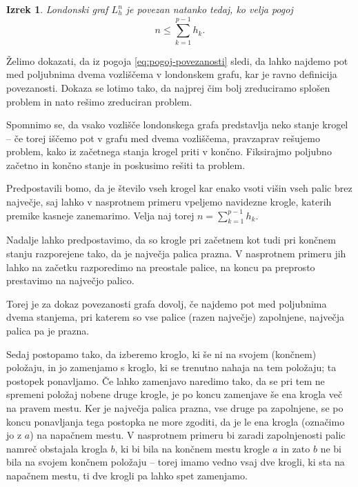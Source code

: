 \documentclass[12pt,a4paper]{amsart}
\theoremstyle{definition} %
\theoremstyle{plain} %
\newtheorem{izrek}[definicija]{Izrek}
\begin{document}
\begin{izrek}
    Londonski graf $L_h^n$ je povezan natanko tedaj, ko velja pogoj
    \begin{equation}
        n \leq \sum_{k=1}^{p-1} h_k.
        \label{eq:pogoj-povezanosti}
    \end{equation}
\end{izrek}

\proof
    Želimo dokazati, da iz pogoja \eqref{eq:pogoj-povezanosti} sledi, da lahko najdemo pot med poljubnima dvema vozliščema v londonskem grafu, kar je ravno definicija povezanosti. Dokaza se lotimo tako, da najprej čim bolj zreduciramo splošen problem in nato rešimo zreduciran problem.
    
    Spomnimo se, da vsako vozlišče londonskega grafa predstavlja neko stanje krogel -- če torej iščemo pot v grafu med dvema vozliščema, pravzaprav rešujemo problem, kako iz začetnega stanja krogel priti v končno. Fiksirajmo poljubno začetno in končno stanje in poskusimo rešiti ta problem.
    
    Predpostavili bomo, da je število vseh krogel kar enako vsoti višin vseh palic brez največje, saj lahko v nasprotnem primeru vpeljemo navidezne krogle, katerih premike kasneje zanemarimo. Velja naj torej $n = \sum_{k=1}^{p-1}h_k$.
    
    Nadalje lahko predpostavimo, da so krogle pri začetnem kot tudi pri končnem stanju razporejene tako, da je največja palica prazna. V nasprotnem primeru jih lahko na začetku razporedimo na preostale palice, na koncu pa preprosto prestavimo na največjo palico.

    Torej je za dokaz povezanosti grafa dovolj, če najdemo pot med poljubnima dvema stanjema, pri katerem so vse palice (razen največje) zapolnjene, največja palica pa je prazna.
    
    Sedaj postopamo tako, da izberemo kroglo, ki še ni na svojem (končnem) položaju, in jo zamenjamo s kroglo, ki se trenutno nahaja na tem položaju; ta postopek ponavljamo. Če lahko zamenjavo naredimo tako, da se pri tem ne spremeni položaj nobene druge krogle, je po koncu zamenjave še ena krogla več na pravem mestu.
    Ker je največja palica prazna, vse druge pa zapolnjene, se po koncu ponavljanja tega postopka ne more zgoditi, da je le ena krogla (označimo jo z $a$) na napačnem mestu. V nasprotnem primeru bi zaradi zapolnjenosti palic namreč obstajala krogla $b$, ki bi bila na končnem mestu krogle $a$ in zato $b$ ne bi bila na svojem končnem položaju -- torej imamo vedno vsaj dve krogli, ki sta na napačnem mestu, ti dve krogli pa lahko spet zamenjamo.
    
\end{document}

